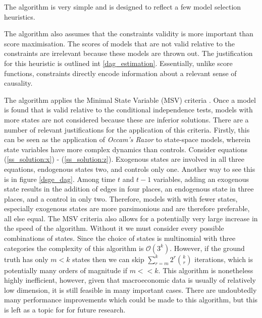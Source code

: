 \documentclass{article}
\begin{document}
The algorithm is very simple and is designed to reflect a few model selection heuristics. 

The algorithm also assumes that the constraints validity is more important than score maximisation. The scores of models that are not valid relative to the constraints are irrelevant because these models are thrown out. The justification for this heuristic is outlined int \ref{dag_estimation}. Essentially, unlike score functions, constraints directly encode information about a relevant sense of causality.

The algorithm applies the Minimal State Variable (MSV) criteria \parencite{mccallum1999role}. Once a model is found that is valid relative to the conditional independence tests, models with more states are not considered because these are inferior solutions. There are a number of relevant justifications for the application of this criteria. Firstly, this can be seen as the application of \textit{Occam's Razor} to state-space models, wherein state variables have more complex dynamics than controls. Consider equations (\ref{ss_solution:x}) - (\ref{ss_solution:z}). Exogenous states are involved in all three equations, endogenous states two, and controls only one. Another way to see this is in figure \ref{dsge_dag}. Among time $t$ and $t-1$ variables, adding an exogenous state results in the addition of edges in four places, an endogenous state in three places, and a control in only two. Therefore, models with with fewer states, especially exogenous states are more parsimonious and are therefore preferable, all else equal. The MSV criteria also allows for a potentially very large increase in the speed of the algorithm. Without it we must consider every possible combinations of states. Since the choice of states is multinomial with three categories the complexity of this algorithm is $\mathcal{O}(3^k)$. However, if the ground truth has only $m < k$ states then we can skip $\sum_{r=m}^{k} 2^r {\binom{k}{r}}$ iterations, which is potentially many orders of magnitude if $m << k$. This algorithm is nonetheless highly inefficient, however, given that macroeconomic data is usually of relatively low dimension, it is still feasible in many important cases. There are undoubtedly many performance improvements which could be made to this algorithm, but this is left as a topic for for future research.
\end{document}

